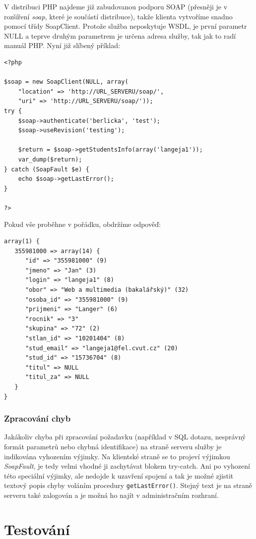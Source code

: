\documentclass[11pt,twoside,a4paper]{book}
\begin{document}
V distribuci PHP najdeme již zabudovanou podporu SOAP (přesněji je v rozšíření \textit{soap}, které je součástí distribuce), takže klienta vytvoříme snadno pomocí třídy SoapClient. Protože služba neposkytuje WSDL, je první parametr NULL a teprve druhým parametrem je určena adresa služby, tak jak to radí manuál PHP\cite{php:soap}. Nyní již slíbený příklad:
\begin{verbatim}
<?php

$soap = new SoapClient(NULL, array(
    "location" => 'http://URL_SERVERU/soap/',
    "uri" => 'http://URL_SERVERU/soap/'));
try {
    $soap->authenticate('berlicka', 'test');
    $soap->useRevision('testing');

    $return = $soap->getStudentsInfo(array('langeja1'));
    var_dump($return);
} catch (SoapFault $e) {
    echo $soap->getLastError();
}

?>
\end{verbatim}

Pokud vše proběhne v pořádku, obdržíme odpověď:

\begin{verbatim}
array(1) {
   355981000 => array(14) {
      "id" => "355981000" (9)
      "jmeno" => "Jan" (3)
      "login" => "langeja1" (8)
      "obor" => "Web a multimedia (bakalářský)" (32)
      "osoba_id" => "355981000" (9)
      "prijmeni" => "Langer" (6)
      "rocnik" => "3"
      "skupina" => "72" (2)
      "stlan_id" => "10201404" (8)
      "stud_email" => "langeja1@fel.cvut.cz" (20)
      "stud_id" => "15736704" (8)
      "titul" => NULL
      "titul_za" => NULL
   }
}
\end{verbatim}

\subsection{Zpracování chyb}
Jakákoliv chyba při zpracování požadavku (například v SQL dotazu, nesprávný formát parametrů nebo chybná identifikace) na straně serveru služby je indikována vyhozením výjimky. Na klientské straně se to projeví výjimkou \textit{SoapFault}, je tedy velmi vhodné ji zachytávat blokem try-catch. Ani po vyhození této speciální výjimky, ale nedojde k uzavření spojení a tak je možné zjistit textový popis chyby voláním procedury \texttt{getLastError()}. Stejný text je na straně serveru také zalogován a je možná ho najít v administračním rozhraní.


\chapter{Testování}
\end{document}

